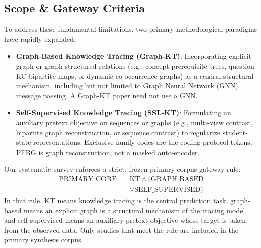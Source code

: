 \documentclass[lettersize,journal]{IEEEtran}
\begin{document}
\subsection{Scope \& Gateway Criteria}
To address these fundamental limitations, two primary methodological paradigms have rapidly expanded:
\begin{itemize}
    \item \textbf{Graph-Based Knowledge Tracing (Graph-KT)}: Incorporating explicit graph or graph-structured relations (e.g., concept prerequisite trees, question-KC bipartite maps, or dynamic co-occurrence graphs) as a central structural mechanism, including but not limited to Graph Neural Network (GNN) message passing. A Graph-KT paper need not use a GNN.
    \item \textbf{Self-Supervised Knowledge Tracing (SSL-KT)}: Formulating an auxiliary pretext objective on sequences or graphs (e.g., multi-view contrast, bipartite graph reconstruction, or sequence contrast) to regularize student-state representations. Exclusive family codes are the coding protocol tokens; PEBG is graph reconstruction, not a masked auto-encoder.
\end{itemize}
Our systematic survey enforces a strict, frozen primary-corpus gateway rule:
\begin{equation}
\begin{split}
\text{PRIMARY\_CORE} = \; & \text{KT} \land (\text{GRAPH\_BASED} \\
& \lor \text{SELF\_SUPERVISED})
\end{split}
\end{equation}
In that rule, KT means knowledge tracing is the central prediction task, graph-based means an explicit graph is a structural mechanism of the tracing model, and self-supervised means an auxiliary pretext objective whose target is taken from the observed data. Only studies that meet the rule are included in the primary synthesis corpus.
\end{document}

